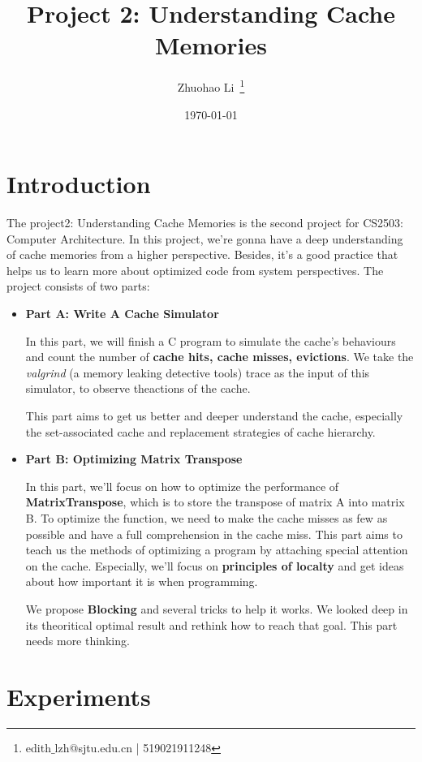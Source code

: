 \documentclass{article}
\title{\textbf{Project 2:  Understanding Cache Memories}} %
\author{Zhuohao Li~\textsuperscript{\Letter }\thanks{edith$\_$lzh@sjtu.edu.cn | 519021911248}}%
\date{\today} %
\begin{document}
\maketitle %

\section{Introduction}

The project2: Understanding Cache Memories is the second project for CS2503: Computer Architecture. In this project, we're gonna have a deep understanding of  cache memories from a higher perspective. Besides, it's a good practice that helps us to learn more about optimized code from system perspectives. The project consists of two parts:
\begin{itemize}
	\item \textbf{ Part A: Write A Cache Simulator}
	
	In this part, we will finish a C program to simulate the cache’s behaviours and count the number of \textbf{cache hits, cache misses, evictions}. We take the \textit{valgrind} (a memory leaking detective tools) trace as the input of this simulator, to observe theactions of the cache. 
	
	This part aims to get us better and deeper understand the cache, especially the set-associated cache and replacement strategies of cache hierarchy.
	\item \textbf{Part B: Optimizing Matrix Transpose}
	
	In this part, we'll focus on how to optimize the performance of \textbf{MatrixTranspose}, which is to store the transpose of matrix A into matrix B. To optimize the function, we need to make the cache misses as few as possible and have a full comprehension in the cache miss. This part aims to teach us the methods of optimizing a program by attaching special attention on the cache. Especially, we'll focus on \textbf{principles of localty} and get ideas about how important it is when programming.
	
	We propose \textbf{Blocking} and several tricks to help it works. We looked deep in its theoritical optimal result and rethink how to reach that goal. This part needs more thinking.
\end{itemize}



\section{Experiments}
\end{document}
